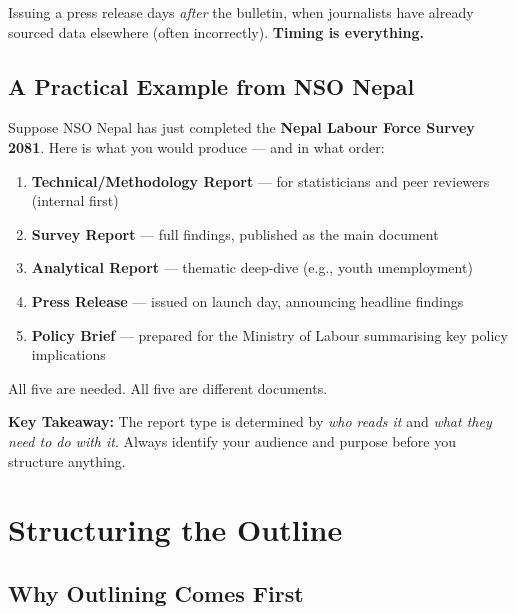 \documentclass[11pt,a4paper,oneside]{book}
\begin{document}
\begin{tcolorbox}[nsolightbox, colframe=nsored, title=\textbf{Common Mistake}]
    Issuing a press release days \emph{after} the bulletin, when journalists have already sourced data elsewhere (often incorrectly). \textbf{Timing is everything.}
\end{tcolorbox}

\section{A Practical Example from NSO Nepal}

Suppose NSO Nepal has just completed the \textbf{Nepal Labour Force Survey 2081}. Here is what you would produce --- and in what order:

\begin{enumerate}
    \item \textbf{Technical/Methodology Report} --- for statisticians and peer reviewers (internal first)
    \item \textbf{Survey Report} --- full findings, published as the main document
    \item \textbf{Analytical Report} --- thematic deep-dive (e.g., youth unemployment)
    \item \textbf{Press Release} --- issued on launch day, announcing headline findings
    \item \textbf{Policy Brief} --- prepared for the Ministry of Labour summarising key policy implications
\end{enumerate}

All five are needed. All five are different documents.

\begin{tcolorbox}[nsolightbox]
\textbf{Key Takeaway:} The report type is determined by \emph{who reads it} and \emph{what they need to do with it}. Always identify your audience and purpose before you structure anything.
\end{tcolorbox}


\chapter{Structuring the Outline}

\section{Why Outlining Comes First}
\end{document}
